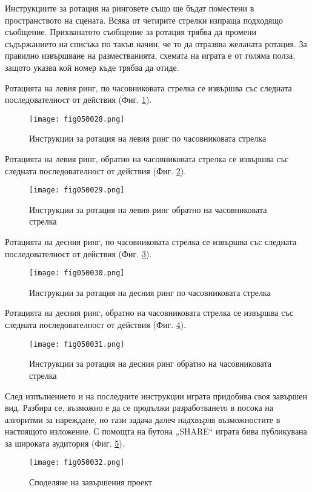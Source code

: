 Инструкциите за ротация на ринговете също ще бъдат поместени в пространството на сцената. Всяка от четирите стрелки изпраща подходящо съобщение. Прихванатото съобщение за ротация трябва да промени съдържанието на списъка по такъв начин, че то да отразява желаната ротация. За правилно извършване на разместванията, схемата на играта е от голяма полза, защото указва кой номер къде трябва да отиде. 

Ротацията на левия ринг, по часовниковата стрелка се извършва със следната последователност от действия (Фиг. \ref{fig050028}).

\begin{figure}[H]
  \centering
  \texttt{[image: fig050028.png]}
  \caption{Инструкции за ротация на левия ринг по часовниковата стрелка}
\label{fig050028}
\end{figure}

Ротацията на левия ринг, обратно на часовниковата стрелка се извършва със следната последователност от действия (Фиг. \ref{fig050029}).

\begin{figure}[H]
  \centering
  \texttt{[image: fig050029.png]}
  \caption{Инструкции за ротация на левия ринг обратно на часовниковата стрелка}
\label{fig050029}
\end{figure}

Ротацията на десния ринг, по часовниковата стрелка се извършва със следната последователност от действия (Фиг. \ref{fig050030}).

\begin{figure}[H]
  \centering
  \texttt{[image: fig050030.png]}
  \caption{Инструкции за ротация на десния ринг по часовниковата стрелка}
\label{fig050030}
\end{figure}

Ротацията на десния ринг, обратно на часовниковата стрелка се извършва със следната последователност от действия (Фиг. \ref{fig050031}).

\begin{figure}[H]
  \centering
  \texttt{[image: fig050031.png]}
  \caption{Инструкции за ротация на десния ринг обратно на часовниковата стрелка}
\label{fig050031}
\end{figure}

След изпълнението и на последните инструкции играта придобива своя завършен вид. Разбира се, възможно е да се продължи разработването в посока на алгоритми за нареждане, но тази задача далеч надхвърля възможностите в настоящото изложение. С помощта на бутона „SHARE“ играта бива публикувана за широката аудитория (Фиг. \ref{fig050032}).

\begin{figure}[H]
  \centering
  \texttt{[image: fig050032.png]}
  \caption{Споделяне на завършения проект}
\label{fig050032}
\end{figure}

